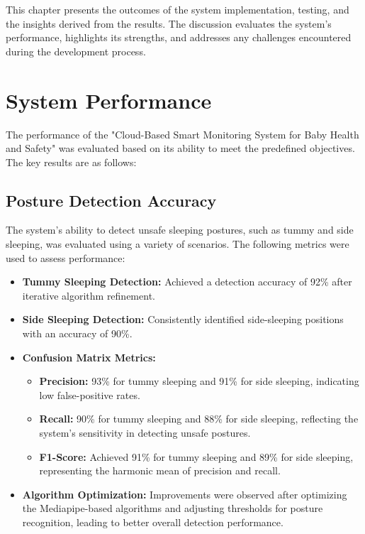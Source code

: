 \documentclass[12pt,a4paper]{report}
\begin{document}
This chapter presents the outcomes of the system implementation, testing, and the insights derived from the results. The discussion evaluates the system's performance, highlights its strengths, and addresses any challenges encountered during the development process.

\section{System Performance}
The performance of the "Cloud-Based Smart Monitoring System for Baby Health and Safety" was evaluated based on its ability to meet the predefined objectives. The key results are as follows:

\subsection{Posture Detection Accuracy}
The system's ability to detect unsafe sleeping postures, such as tummy and side sleeping, was evaluated using a variety of scenarios. The following metrics were used to assess performance:

\begin{itemize}
    \item \textbf{Tummy Sleeping Detection:} Achieved a detection accuracy of 92\% after iterative algorithm refinement. 
    \item \textbf{Side Sleeping Detection:} Consistently identified side-sleeping positions with an accuracy of 90\%.
    \item \textbf{Confusion Matrix Metrics:} 
    \begin{itemize}
        \item \textbf{Precision:} 93\% for tummy sleeping and 91\% for side sleeping, indicating low false-positive rates.
        \item \textbf{Recall:} 90\% for tummy sleeping and 88\% for side sleeping, reflecting the system's sensitivity in detecting unsafe postures.
        \item \textbf{F1-Score:} Achieved 91\% for tummy sleeping and 89\% for side sleeping, representing the harmonic mean of precision and recall.
    \end{itemize}
    \item \textbf{Algorithm Optimization:} Improvements were observed after optimizing the Mediapipe-based algorithms and adjusting thresholds for posture recognition, leading to better overall detection performance.
\end{itemize}
\end{document}
